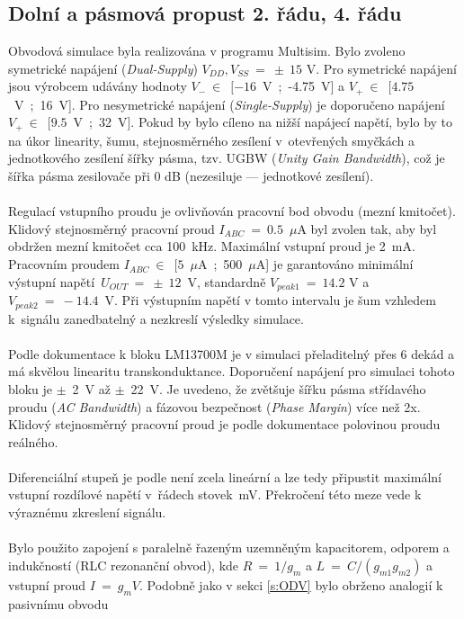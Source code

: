 \subsection{Dolní a pásmová propust 2. řádu, 4. řádu}\label{s:DP2}
\noindent Obvodová simulace byla realizována v programu Multisim. Bylo zvoleno symetrické napájení (\textit{Dual-Supply}) $V_{DD},V_{SS}~=~\pm~15$ V. Pro symetrické napájení jsou výrobcem udávány hodnoty $V_{-}~\in$~$[-16$~V~;~-4.75~V] a $V_{+}~\in$~$[4.75$~V~;~16~V]. Pro nesymetrické napájení (\textit{Single-Supply}) je doporučeno napájení $V_{+}~\in$~$[9.5$~V~;~32~V]. Pokud by bylo cíleno na nižší napájecí napětí, bylo by to na úkor linearity, šumu, stejnosměrného zesílení v~otevřených smyčkách a jednotkového zesílení šířky pásma, tzv. UGBW (\textit{Unity Gain Bandwidth}), což je šířka pásma zesilovače při 0 dB (nezesiluje --- jednotkové zesílení).\\
\\
Regulací vstupního proudu je ovlivňován pracovní bod obvodu (mezní kmitočet). Klidový stejnosměrný pracovní proud $I_{ABC}~=~0.5$~$\mu$A byl zvolen tak, aby byl obdržen mezní kmitočet cca 100~kHz. Maximální vstupní proud je 2~mA. Pracovním proudem $I_{ABC}~\in$~$[5$~$\mu$A~;~500~$\mu$A] je garantováno minimální výstupní napětí~$U_{OUT}~=~\pm~12$~V, standardně $V_{peak 1}~=~14.2$ V a $V_{peak 2}~=~-14.4$~V. Při výstupním napětí v tomto intervalu je šum vzhledem k~signálu zanedbatelný a nezkreslí výsledky simulace.\\
\\
\noindent Podle dokumentace k bloku LM13700M je v simulaci přeladitelný přes 6 dekád a má skvělou linearitu transkonduktance. Doporučení napájení pro simulaci tohoto bloku je $\pm$~2~V až $\pm$~22~V. Je uvedeno, že zvětšuje šířku pásma střídavého proudu (\textit{AC Bandwidth}) a fázovou bezpečnost (\textit{Phase Margin}) více než 2x. Klidový stejnosměrný pracovní proud je podle dokumentace polovinou proudu reálného.\\
\\
\noindent Diferenciální stupeň je podle není zcela lineární a lze tedy připustit maximální vstupní rozdílové napětí v~řádech stovek~mV. Překročení této meze vede k výraznému zkreslení signálu.\\
\\
\noindent Bylo použito zapojení s paralelně řazeným uzemněným kapacitorem, odporem a indukčností (RLC rezonanční obvod), kde $R~=~1/g_m$ a $L~=~C/(g_{m1}g_{m2})$ a vstupní proud $I~=~g_mV$. Podobně jako v sekci \ref{s:ODV} bylo obrženo analogií k pasivnímu obvodu
